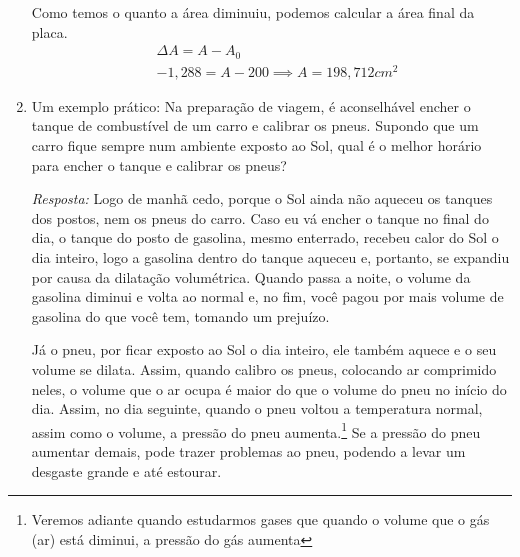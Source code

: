 \documentclass[12pt]{extarticle}
\newcommand{\<}{\langle}
\renewcommand{\>}{\rangle}
\theoremstyle{definition}
\begin{document}
\begin{enumerate}
Como temos o quanto a área diminuiu, podemos calcular a área final da placa.
\begin{align*}
    &\Delta A = A - A_0\\
    &-1,288 = A - 200 \implies \boxed{A = 198,712 cm^2}
\end{align*}

\item Um exemplo prático: Na preparação de viagem, é aconselhável encher o tanque de combustível de um carro e calibrar os pneus. Supondo que um carro fique sempre num ambiente exposto ao Sol, qual é o melhor horário para encher o tanque e calibrar os pneus?

\textit{Resposta:} Logo de manhã cedo, porque o Sol ainda não aqueceu os tanques dos postos, nem os pneus do carro. Caso eu vá encher o tanque no final do dia, o tanque do posto de gasolina, mesmo enterrado, recebeu calor do Sol o dia inteiro, logo a gasolina dentro do tanque aqueceu e, portanto, se expandiu por causa da dilatação volumétrica. Quando passa a noite, o volume da gasolina diminui e volta ao normal e, no fim, você pagou por mais volume de gasolina do que você tem, tomando um prejuízo.


Já o pneu, por ficar exposto ao Sol o dia inteiro, ele também aquece e o seu volume se dilata. Assim, quando calibro os pneus, colocando ar comprimido neles, o volume que o ar ocupa é maior do que o volume do pneu no início do dia. Assim, no dia seguinte, quando o pneu voltou a temperatura normal, assim como o volume, a pressão do pneu aumenta.\footnote{Veremos adiante quando estudarmos gases que quando o volume que o gás (ar) está diminui, a pressão do gás aumenta} Se a pressão do pneu aumentar demais, pode trazer problemas ao pneu, podendo a levar um desgaste grande e até estourar.


\end{enumerate}
\end{document}
